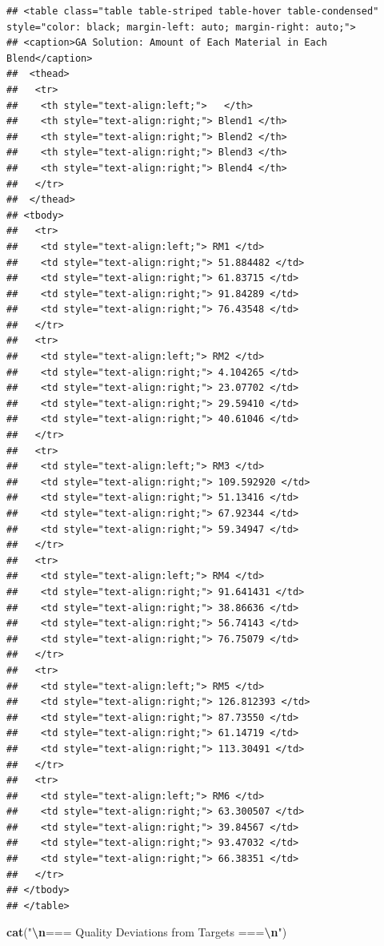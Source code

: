 \documentclass[
]{article}
\newenvironment{Shaded}{\begin{snugshade}}{\end{snugshade}}
\newcommand{\FunctionTok}[1]{\textcolor[rgb]{0.13,0.29,0.53}{\textbf{#1}}}
\newcommand{\NormalTok}[1]{#1}
\newcommand{\SpecialCharTok}[1]{\textcolor[rgb]{0.81,0.36,0.00}{\textbf{#1}}}
\newcommand{\StringTok}[1]{\textcolor[rgb]{0.31,0.60,0.02}{#1}}
\begin{document}
\begin{verbatim}
## <table class="table table-striped table-hover table-condensed" style="color: black; margin-left: auto; margin-right: auto;">
## <caption>GA Solution: Amount of Each Material in Each Blend</caption>
##  <thead>
##   <tr>
##    <th style="text-align:left;">   </th>
##    <th style="text-align:right;"> Blend1 </th>
##    <th style="text-align:right;"> Blend2 </th>
##    <th style="text-align:right;"> Blend3 </th>
##    <th style="text-align:right;"> Blend4 </th>
##   </tr>
##  </thead>
## <tbody>
##   <tr>
##    <td style="text-align:left;"> RM1 </td>
##    <td style="text-align:right;"> 51.884482 </td>
##    <td style="text-align:right;"> 61.83715 </td>
##    <td style="text-align:right;"> 91.84289 </td>
##    <td style="text-align:right;"> 76.43548 </td>
##   </tr>
##   <tr>
##    <td style="text-align:left;"> RM2 </td>
##    <td style="text-align:right;"> 4.104265 </td>
##    <td style="text-align:right;"> 23.07702 </td>
##    <td style="text-align:right;"> 29.59410 </td>
##    <td style="text-align:right;"> 40.61046 </td>
##   </tr>
##   <tr>
##    <td style="text-align:left;"> RM3 </td>
##    <td style="text-align:right;"> 109.592920 </td>
##    <td style="text-align:right;"> 51.13416 </td>
##    <td style="text-align:right;"> 67.92344 </td>
##    <td style="text-align:right;"> 59.34947 </td>
##   </tr>
##   <tr>
##    <td style="text-align:left;"> RM4 </td>
##    <td style="text-align:right;"> 91.641431 </td>
##    <td style="text-align:right;"> 38.86636 </td>
##    <td style="text-align:right;"> 56.74143 </td>
##    <td style="text-align:right;"> 76.75079 </td>
##   </tr>
##   <tr>
##    <td style="text-align:left;"> RM5 </td>
##    <td style="text-align:right;"> 126.812393 </td>
##    <td style="text-align:right;"> 87.73550 </td>
##    <td style="text-align:right;"> 61.14719 </td>
##    <td style="text-align:right;"> 113.30491 </td>
##   </tr>
##   <tr>
##    <td style="text-align:left;"> RM6 </td>
##    <td style="text-align:right;"> 63.300507 </td>
##    <td style="text-align:right;"> 39.84567 </td>
##    <td style="text-align:right;"> 93.47032 </td>
##    <td style="text-align:right;"> 66.38351 </td>
##   </tr>
## </tbody>
## </table>
\end{verbatim}

\begin{Shaded}
\begin{Highlighting}[]
\FunctionTok{cat}\NormalTok{(}\StringTok{"}\SpecialCharTok{\textbackslash{}n}\StringTok{=== Quality Deviations from Targets ===}\SpecialCharTok{\textbackslash{}n}\StringTok{"}\NormalTok{)}
\end{Highlighting}
\end{Shaded}
\end{document}
